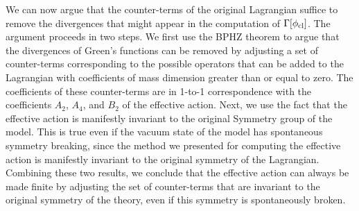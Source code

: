 We can now argue that the counter-terms of the original Lagrangian suffice to remove the divergences that might appear in the computation of $\Gamma[\phi_{\rm cl}]$. The argument proceeds in two steps. We first use the BPHZ theorem to argue that the divergences of Green's functions can be removed by adjusting a set of counter-terms corresponding to the possible operators that can be added to the Lagrangian with coefficients of mass dimension greater than or equal to zero. The coefficients of these counter-terms are in 1-to-1 correspondence with the coefficients $A_2$, $A_4$, and $B_2$ of the effective action. Next, we use the fact that the effective action is manifestly invariant to the original Symmetry group of the model. This is true even if the vacuum state of the model has spontaneous symmetry breaking, since the method we presented for computing the effective action is manifestly invariant to the original symmetry of the Lagrangian. Combining these two results, we conclude that the effective action can always be made finite by adjusting the set of counter-terms that are invariant to the original symmetry of the theory, even if this symmetry is spontaneously broken.

